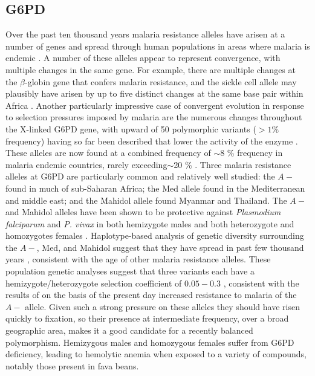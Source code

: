 \documentclass{article}
\begin{document}
\subsection{G6PD}

Over the past ten thousand years malaria resistance alleles have arisen at a number
of genes and spread through human populations in areas where malaria is endemic \citep{Kwiatkowski:05}. 
A number of these alleles appear to represent convergence, with
multiple changes in the same gene. 
For example, there are multiple
changes at the $\beta$-globin gene that confers malaria resistance,
and the sickle cell allele may plausibly have arisen by up to five distinct
changes at the same base pair within Africa
\citep{Flint:98,ralph2010parallel}.
Another particularly impressive case of convergent evolution in response to
selection pressures imposed by malaria are the numerous changes throughout the
X-linked G6PD gene, with upward of 50 polymorphic variants ($>1\%$ frequency) having so far been
described that lower the activity of the enzyme \citep{Howes-g6pd-variants,Minucci-g6pd}. These alleles are now
found at a combined frequency of $\sim$8 \% frequency in malaria endemic countries, rarely
exceeding$\sim$20 \% \citep{Howes-g6pd-preval}. Three malaria
resistance alleles at G6PD are particularly common and relatively well
studied: the $A-$ found in
much of sub-Saharan Africa; the Med allele found in the Mediterranean and middle
east; and the Mahidol allele found Myanmar and Thailand.
The $A-$ and Mahidol alleles have been shown
to be protective against {\it Plasmodium falciparum} and {\it P. vivax} in both
hemizygote males and both heterozygote and homozygotes females \citep{Ruwende-g6pd,
Louicharoen-g6pd}. Haplotype-based analysis of genetic diversity surrounding
the $A-$, Med, and Mahidol suggest that they have spread in past few
thousand years \citet{tishkoff-g6pd,Slatkin-age-est,Saunders-g6pd,Louicharoen-g6pd}, 
consistent with the age of other malaria resistance alleles. 
These population genetic analyses suggest that three variants each have a hemizygote/heterozygote 
selection coefficient of $0.05-0.3$ \citep{tishkoff-g6pd,Slatkin-age-est,Saunders-g6pd,Louicharoen-g6pd}, consistent with
the results of \citet{Ruwende-g6pd} on the basis of the present day increased resistance to malaria of the
$A-$ allele. 
Given such a strong pressure on these alleles they should have risen
quickly to fixation, so their presence at intermediate frequency,
over a broad geographic area, makes it a good candidate for a recently
balanced polymorphism. 
Hemizygous males and homozygous females suffer from G6PD deficiency,
leading to hemolytic anemia when exposed to a variety of compounds, notably
those present in fava beans. 
\end{document}
